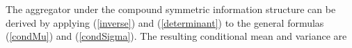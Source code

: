 \documentclass[11pt,twoside]{article}
\theoremstyle{definition}
\theoremstyle{definition}
\begin{document}
The aggregator under the compound symmetric information structure can be derived by applying (\ref{inverse}) and (\ref{determinant}) to the general formulas (\ref{condMu}) and (\ref{condSigma}). The resulting conditional mean and variance are 
%
\end{document}
